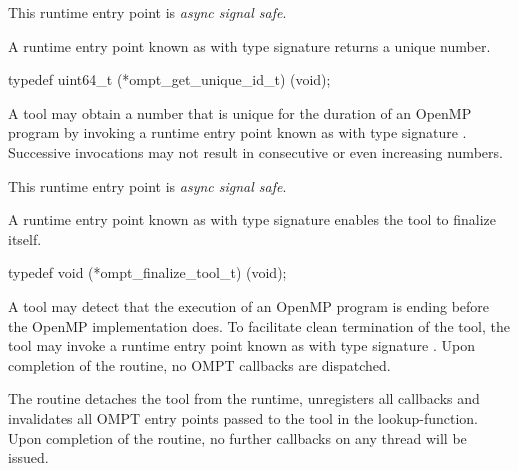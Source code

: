 This runtime entry point is \emph{async signal safe}.



\label{sec:ompt_get_unique_id_t}
\label{sec:ompt_get_unique_id}

\summary
A runtime entry point known as 
with type signature 
returns a unique number.

\format
\begin{ccppspecific}
\begin{omptInquiry}
typedef uint64_t (*ompt_get_unique_id_t) (void);
\end{omptInquiry}
\end{ccppspecific}

\descr

A tool may obtain a number that is unique for the duration of an
OpenMP program by invoking a runtime entry point
known as 
with type signature .
Successive invocations may not result in
consecutive or even increasing numbers.

This runtime entry point is \emph{async signal safe}.


\label{sec:ompt_finalize_tool_t}
\label{sec:ompt_finalize_tool}

\summary
A runtime entry point known as 
with type signature 
enables the tool to finalize itself.

\format
\begin{ccppspecific}
\begin{omptInquiry}
typedef void (*ompt_finalize_tool_t) (void);
\end{omptInquiry}
\end{ccppspecific}

\descr

A tool may detect that the execution of an OpenMP program is ending 
before the OpenMP implementation does.
To facilitate clean termination of the tool, the tool may
invoke a runtime entry point known as 
with type signature . 
Upon completion of the  routine, no OMPT callbacks are 
dispatched.

\effect

The  routine detaches the tool from the runtime, unregisters 
all callbacks and invalidates all OMPT entry points passed to the tool in the 
lookup-function. 
Upon completion of the  routine, no further callbacks on any 
thread will be issued.

